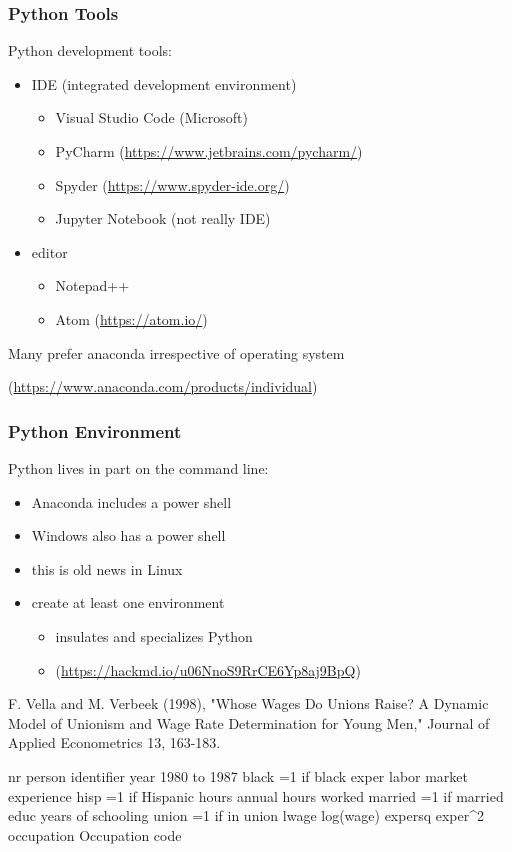 \documentclass[aspectratio=169,t]{beamer}
\begin{document}
\begin{frame}
  \frametitle{Python Tools}

  Python development tools:
  \begin{itemize}
   \item IDE (integrated development environment)
     \begin{itemize}
      \item Visual Studio Code (Microsoft)
      \item PyCharm (\url{https://www.jetbrains.com/pycharm/})
      \item Spyder (\url{https://www.spyder-ide.org/})
      \item Jupyter Notebook (not really IDE)
     \end{itemize}
   \item editor
     \begin{itemize}
      \item Notepad++
      \item Atom (\url{https://atom.io/})
     \end{itemize}
  \end{itemize}

  Many prefer anaconda irrespective of operating system

  (\url{https://www.anaconda.com/products/individual})

\end{frame}


\begin{frame}
  \frametitle{Python Environment}

  Python lives in part on the command line:
  \begin{itemize}
   \item Anaconda includes a power shell
   \item Windows also has a power shell
   \item this is old news in Linux
   \item create at least one environment
     \begin{itemize}
      \item insulates and specializes Python
      \item (\url{https://hackmd.io/u06NnoS9RrCE6Yp8aj9BpQ})
     \end{itemize}
  \end{itemize}


F. Vella and M. Verbeek (1998), "Whose Wages Do Unions Raise? A Dynamic Model
of Unionism and Wage Rate Determination for Young Men," Journal of Applied
Econometrics 13, 163-183.

nr                       person identifier
year                     1980 to 1987
black                    =1 if black
exper                    labor market experience
hisp                     =1 if Hispanic
hours                    annual hours worked
married                  =1 if married
educ                     years of schooling
union                    =1 if in union
lwage                    log(wage)
expersq                  exper^2
occupation               Occupation code


\end{frame}
\end{document}
